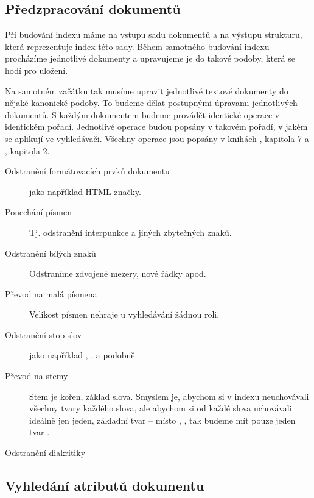 \documentclass{article}
\newcommand{\code}[1]{\texttt{#1}}
\begin{document}
\subsection{Předzpracování dokumentů}
\label{prepr}
Při budování indexu máme na vstupu sadu dokumentů a na výstupu strukturu, která reprezentuje index této sady. Během samotného budování indexu procházíme jednotlivé dokumenty a upravujeme je do takové podoby, která se hodí pro uložení.

Na samotném začátku tak musíme upravit jednotlivé textové dokumenty do nějaké kanonické podoby. To budeme dělat postupnými úpravami jednotlivých dokumentů. S každým dokumentem budeme provádět identické operace v identickém pořadí. Jednotlivé operace budou popsány v takovém pořadí, v jakém se aplikují ve vyhledávači. Všechny operace jsou popsány v knihách \cite{modernir}, kapitola 7 a \cite{introir}, kapitola 2.


\begin{description}

\item[Odstranění formátovacích prvků dokumentu] jako například HTML značky. 
\item[Ponechání písmen] Tj. odstranění interpunkce a jiných zbytečných znaků.
\item[Odstranění bílých znaků] Odstraníme zdvojené mezery, nové řádky apod.
\item[Převod na malá písmena] Velikost písmen nehraje u vyhledávání žádnou roli.
\item[Odstranění stop slov] jako například , ,  a podobně.
\item[Převod na stemy] Stem je kořen, základ slova. Smyslem je, abychom si v indexu neuchovávali všechny tvary každého slova, ale abychom si od každé slova uchovávali ideálně jen jeden, základní tvar -- místo , ,  tak budeme mít pouze jeden tvar .
\item[Odstranění diakritiky] 
\end{description} 


\subsection{Vyhledání atributů dokumentu} 
\end{document}
